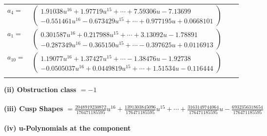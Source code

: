 \documentclass[1p]{elsarticle_modified}
\theoremstyle{definition}
\begin{document}
\begin{tabular}{m{7pt} m{180pt} m{7pt} m{180pt} }
\flushright $a_{4}=$&$\begin{pmatrix}1.91038 u^{16}+1.97719 u^{15}+\cdots+7.59306 u-7.13699\\-0.551461 u^{16}-0.673429 u^{15}+\cdots+0.977195 u+0.0668101\end{pmatrix}$ \\
\flushright $a_{1}=$&$\begin{pmatrix}0.301587 u^{16}+0.217988 u^{15}+\cdots+3.13092 u-1.78891\\-0.287349 u^{16}-0.365150 u^{15}+\cdots-0.397625 u+0.0116913\end{pmatrix}$ \\
\flushright $a_{10}=$&$\begin{pmatrix}1.19077 u^{16}+1.37427 u^{15}+\cdots-1.38476 u-1.92738\\-0.0505037 u^{16}+0.0449819 u^{15}+\cdots+1.51534 u-0.116444\end{pmatrix}$\\&\end{tabular}
\flushleft \textbf{(ii) Obstruction class $= -1$}\\~\\
\flushleft \textbf{(iii) Cusp Shapes $= \frac{2048919230872}{176471185595} u^{16}+\frac{1391303845096}{176471185595} u^{15}+\cdots+\frac{3163149744064}{176471185595} u-\frac{6932356318654}{176471185595}$}\\~\\
\newpage\renewcommand{\arraystretch}{1}
\flushleft \textbf{(iv) u-Polynomials at the component}\newline \\
\end{document}
